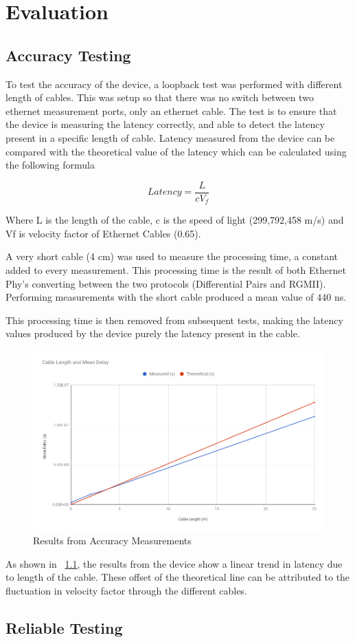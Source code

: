 \chapter{Evaluation}\label{C:eval}

\section{Accuracy Testing}
\par To test the accuracy of the device, a loopback test was performed with different length of cables. This was 
setup so that there was no switch between two ethernet measurement ports, only an ethernet cable. The test is to 
ensure that the device is measuring the latency correctly, and able to detect the latency present in a specific 
length of cable. Latency measured from the device can be compared with the theoretical value of the latency which 
can be calculated using the following formula

\[Latency = \frac{L}{cV_f}\]

\par Where L is the length of the cable, c is the speed of light (299,792,458 m/s) and Vf is velocity factor of 
Ethernet Cables (0.65). 

\par A very short cable (4 cm) was used to measure the processing time, a constant added to every measurement. 
This processing time is the result of both Ethernet Phy’s converting between the two protocols (Differential Pairs 
and RGMII). Performing measurements with the short cable produced a mean value of 440 ns. 

\par This processing time is then removed from subsequent tests, making the latency values produced by the device 
purely the latency present in the cable.

\begin{figure}[H]
    \begin{center}
        \includegraphics[keepaspectratio,width=15cm]{Images/CableTesting}
        \caption{Results from Accuracy Measurements}
        \label{fig:accuracyMeasurements}
    \end{center}
\end{figure}

\par As shown in ~\ref{fig:accuracyMeasurements}, the results from the device show a linear trend in latency due to 
length of the cable. These offset of the theoretical line can be attributed to the fluctuation in velocity factor 
through the different cables.

\section{Reliable Testing}
